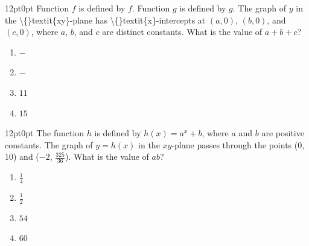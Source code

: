 \documentclass[11pt, twocolumn]{article}
\newcounter{questionnum}
\begin{document}
\vspace{6pt}\noindent
\begin{minipage}{\columnwidth}\raggedright
\noindent{}\par\vspace{8pt}
\begin{adjustwidth}{12pt}{0pt}
Function $f$ is defined by $f$. Function $g$ is defined by $g$. The graph of $y$ in the \textbackslash\{\}textit\{xy\}-plane has \textbackslash\{\}textit\{x\}-intercepts at $(a,0)$, $(b,0)$, and $(c,0)$, where $a$, $b$, and $c$ are distinct constants. What is the value of $a + b + c$?
\begin{enumerate}[label=\Alph*),leftmargin=18pt,topsep=3pt,itemsep=2pt]
  \item $-$
  \item $-$
  \item $11$
  \item $15$
\end{enumerate}
\end{adjustwidth}
\end{minipage}\par

\vspace{6pt}\noindent
\begin{minipage}{\columnwidth}\raggedright
\noindent{}\par\vspace{8pt}
\begin{adjustwidth}{12pt}{0pt}
The function $h$ is defined by $h(x)={a}^{x}+b$, where $a$ and $b$ are positive constants. The graph of $y=h(x)$ in the $x y$-plane passes through the points ($0$, $10$) and ($-2$, $\frac{325}{36}$). What is the value of $a b$?
\begin{enumerate}[label=\Alph*),leftmargin=18pt,topsep=3pt,itemsep=2pt]
  \item $\frac{1}{4}$
  \item $\frac{1}{2}$
  \item $54$
  \item $60$
\end{enumerate}
\end{adjustwidth}
\end{minipage}\par
\end{document}
